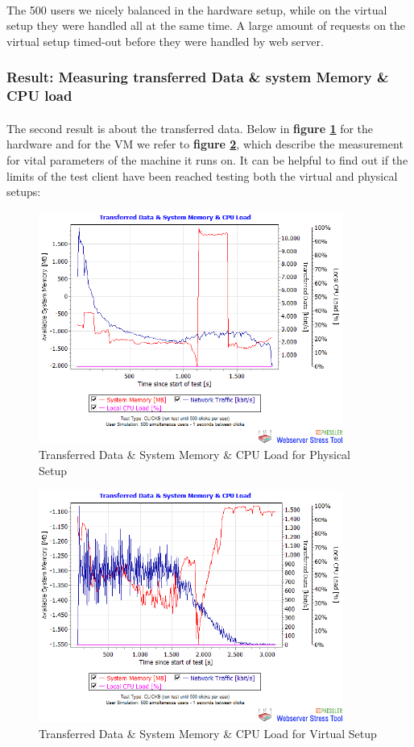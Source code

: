 \paragraph{}
The 500 users we nicely balanced in the hardware setup, while on the virtual setup they were handled all at the same time. A large amount of requests on the virtual setup timed-out before they were handled by web server. 

\subsubsection{Result: Measuring transferred Data \& system Memory \& CPU load}
\paragraph{}
The second result is about the transferred data. Below in \textbf{figure \ref{fig:resP2hw}} for the hardware and for the VM we refer to \textbf{figure \ref{fig:resP2vm}}, which describe the measurement for vital parameters of the machine it runs on. It can be helpful to find out if the limits of the test client have been reached testing both the virtual and physical setups:

 \begin{figure}[H]
    \centering
    \includegraphics[width=10cm]{Pictures/ph1.png}
    \caption{Transferred Data \& System Memory \& CPU Load for Physical Setup}
    \label{fig:resP2hw}
\end{figure}
   
 
\begin{figure}[H]
    \centering
    \includegraphics[width=10cm]{Pictures/vm1.png}
    \caption{Transferred Data \& System Memory \& CPU Load for Virtual Setup}
    \label{fig:resP2vm}
\end{figure} 

